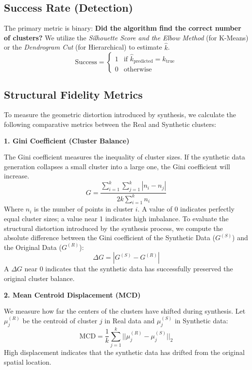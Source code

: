 \subsection{Success Rate (Detection)}
The primary metric is binary: \textbf{Did the algorithm find the correct number of clusters?} We utilize the \textit{Silhouette Score and the Elbow Method} (for K-Means) \cite{rousseeuw1987} or the \textit{Dendrogram Cut} (for Hierarchical) to estimate $\hat{k}$.
\begin{equation}
  \text{Success} =
  \begin{cases}
    1 & \text{if } \hat{k}_{\text{predicted}} = k_{\text{true}} \\
    0 & \text{otherwise}
  \end{cases}
\end{equation}

\subsection{Structural Fidelity Metrics}
To measure the geometric distortion introduced by synthesis, we calculate the following comparative metrics between the Real and Synthetic clusters:

\textbf{1. Gini Coefficient (Cluster Balance)}

The Gini coefficient measures the inequality of cluster sizes. If the synthetic data generation collapses a small cluster into a large one, the Gini coefficient will increase.
\begin{equation}
  G = \frac{\sum_{i=1}^{k} \sum_{j=1}^{k} |n_i - n_j|}{2k \sum_{i=1}^{k} n_i}
\end{equation}
Where $n_i$ is the number of points in cluster $i$. A value of 0 indicates perfectly equal cluster sizes; a value near 1 indicates high imbalance. To evaluate the structural distortion introduced by the synthesis process, we compute the absolute difference between the Gini coefficient of the Synthetic Data ($G^{(S)}$) and the Original Data ($G^{(R)}$):
\begin{equation}
  \Delta G = |G^{(S)} - G^{(R)}|
\end{equation}
A $\Delta G$ near $0$ indicates that the synthetic data has successfully preserved the original cluster balance.

\textbf{2. Mean Centroid Displacement (MCD)}

We measure how far the centers of the clusters have shifted during synthesis. Let $\mu_j^{(R)}$ be the centroid of cluster $j$ in Real data and $\mu_j^{(S)}$ in Synthetic data:
\begin{equation}
  \text{MCD} = \frac{1}{k} \sum_{j=1}^{k} ||\mu_j^{(R)} - \mu_j^{(S)}||_2
\end{equation}
High displacement indicates that the synthetic data has drifted from the original spatial location.

